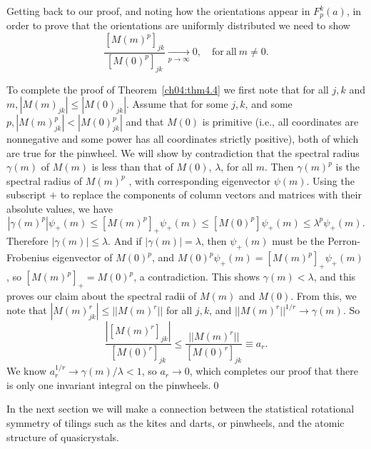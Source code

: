 \documentclass[reqno]{stml-l}
\theoremstyle{plain}
\theoremstyle{definition}
\numberwithin{equation}{chapter}
\begin{document}
Getting back to our proof, and noting how the orientations appear in $F_{p}^{k}(a)$, in order to prove that the orientations are uniformly distributed we need to show
\begin{equation}\label{ch04:eqn4.13}
\frac{[M(m)^{p}]_{jk}}{[M(0)^{p}]_{jk}}\mathop{\longrightarrow}\limits_{p\rightarrow\infty}0, \quad \mathrm{for\ all}\ m \neq 0.
\end{equation}

To complete the proof of Theorem~\ref{ch04:thm4.4} we first note that for all $j,k$ and $m,|M(m)_{jk}|\leq|M(0)_{jk}|$. Assume that for some $j,k$, and some $p,|M(m)_{jk}^{p}|<|M(0)_{jk}^{p}|$ and that $M(0)$ is primitive (i.e., all coordinates are nonnegative and some power has all coordinates strictly positive), both of which are true for the pinwheel. We will show by contradiction that the spectral radius $\gamma(m)$ of $M(m)$ is less than that of $M(0)$, $\lambda$, for all $m$. Then $\gamma(m)^{p}$ is the spectral radius of $M(m)^{p}$ \cite[p. 322]{bib:BaN}, with corresponding eigenvector $\psi(m)$. Using the subscript $+$ to replace the components of column vectors and matrices with their absolute values, we have
\begin{equation}\label{ch04:eqn4.14}
|\gamma(m)^{p}|\psi_{+}(m)\leq[M(m)^{p}]_{+}\psi_{+}(m)\leq[M(0)^{p}]\psi_{+}(m)\leq\lambda^{p}\psi_{+}(m). \end{equation}
Therefore $|\gamma(m)|\leq\lambda$. And if $|\gamma(m)|=\lambda$, then $\psi_{+}(m)$ must be the Perron-Frobenius eigenvector of $M(0)^{p}$, and $M(0)^{p}\psi_{+}(m)=[M(m)^{p}]_{+}\psi_{+}(m)$, so $[M(m)^{p}]_{+}=M(0)^{p}$, a contradiction. This shows $\gamma(m)<\lambda$, and this proves our claim about the spectral radii of $M(m)$ and $M(0)$. From this, we note that $|M(m)_{jk}^{r}|\leq||M(m)^{r}||$ for all $j,k$, and $||M(m)^{r}||^{1/r}\longrightarrow\gamma(m)$. So
\begin{equation}\label{ch04:eqn4.15}
\frac{|[M(m)^{r}]_{jk}|}{[M(0)^{r}]_{jk}}\leq\frac{||M(m)^{r}||}{[M(0)^{r}]_{jk}}\equiv a_{r}.
\end{equation}
We know $a_{r}^{1/r}\longrightarrow\gamma(m)/\lambda<1$, so
$a_{r}\rightarrow 0$, which completes our proof that there
is only one invariant integral on the pinwheels.\qed


In the next section we will make a connection between the statistical rotational symmetry of tilings such as the kites and darts, or pinwheels, and the atomic structure of quasicrystals.
\end{document}
